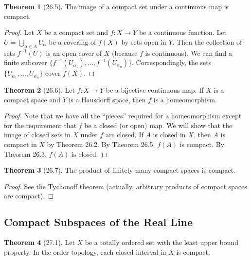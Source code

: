 \documentclass{article}
\theoremstyle{definition}
\newtheorem{theorem}{Theorem}[subsection]
\begin{document}
\begin{flushleft}
\begin{theorem}[26.5]
The image of a compact set under a continuous map is compact.
\end{theorem}

\begin{proof}
Let $X$ be a compact set and $f: X \to Y$ be a continuous function. Let $U = \bigcup_{\alpha \in A} U_\alpha$ be a covering of $f(X)$ by sets open in $Y$. Then the collection of sets $f^{-1}(U)$ is an open cover of $X$ (because $f$ is continuous). We can find a finite subcover $\{f^{-1}(U_{\alpha_1}), \dots, f^{-1}(U_{\alpha_n})\}$. Correspondingly, the sets $\{U_{\alpha_1},\dots,U_{\alpha_n}\}$ cover $f(X)$.
\end{proof}

\begin{theorem}[26.6]
Let $f : X \to Y$ be a bijective continuous map. If $X$ is a compact space and $Y$ is a Hausdorff space, then $f$ is a homeomorphism.
\end{theorem}

\begin{proof}
Note that we have all the ``pieces'' required for a homeomorphism except for the requirement that $f$ be a closed (or open) map. We will show that the image of closed sets in $X$ under $f$ are closed. If $A$ is closed in $X$, then $A$ is compact in $X$ by Theorem 26.2. By Theorem 26.5, $f(A)$ is compact. By Theorem 26.3, $f(A)$ is closed.
\end{proof}

\begin{theorem}[26.7]
The product of finitely many compact spaces is compact.
\end{theorem}

\begin{proof}
See the Tychonoff theorem (actually, arbitrary products of compact spaces are compact).
\end{proof}

\subsection{Compact Subspaces of the Real Line}

\begin{theorem}[27.1]
Let $X$ be a totally ordered set with the least upper bound property. In the order topology, each closed interval in $X$ is compact.
\end{theorem}


\end{flushleft}
\end{document}
